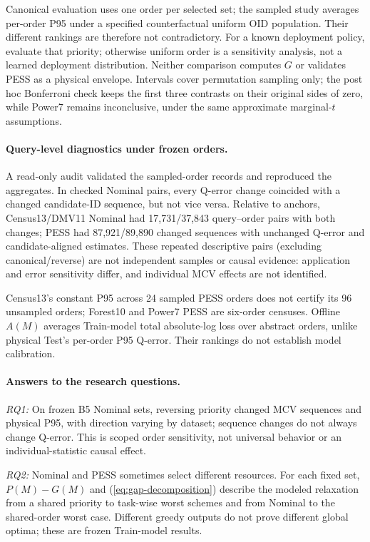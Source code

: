\documentclass[sigconf, nonacm]{acmart}
\begin{document}
Canonical evaluation uses one order per selected set; the sampled
study averages per-order P95 under a specified counterfactual uniform
OID population. Their different rankings are therefore not
contradictory. For a known deployment policy, evaluate that priority;
otherwise uniform order is a sensitivity analysis, not a learned
deployment distribution. Neither comparison computes \(G\) or
validates PESS as a physical envelope. Intervals cover permutation
sampling only; the post hoc Bonferroni check keeps the first three
contrasts on their original sides of zero, while Power7 remains
inconclusive, under the same approximate marginal-\(t\) assumptions.

\paragraph{Query-level diagnostics under frozen orders.}
A read-only audit validated the sampled-order records and reproduced
the aggregates. In checked Nominal pairs, every Q-error change
coincided with a changed candidate-ID sequence, but not vice versa.
Relative to anchors, Census13/DMV11 Nominal had 17,731/37,843
query--order pairs with both changes; PESS had 87,921/89,890
changed sequences with unchanged Q-error and candidate-aligned
estimates. These repeated descriptive pairs (excluding
canonical/reverse) are not independent samples or causal evidence:
application and error sensitivity differ, and individual MCV effects
are not identified.

Census13's constant P95 across 24 sampled PESS orders does not
certify its 96 unsampled orders; Forest10 and Power7 PESS are
six-order censuses. Offline \(A(M)\) averages Train-model total
absolute-log loss over abstract orders, unlike physical Test's
per-order P95 Q-error. Their rankings do not establish model
calibration.
\paragraph{Answers to the research questions.}
\emph{RQ1:} On frozen B5 Nominal sets, reversing priority changed
MCV sequences and physical P95, with direction varying by dataset;
sequence changes do not always change Q-error. This is scoped order
sensitivity, not universal behavior or an individual-statistic
causal effect.

\emph{RQ2:} Nominal and PESS sometimes select different resources.
For each fixed set, \(P(M)-G(M)\) and
(\ref{eq:gap-decomposition}) describe the modeled relaxation from a
shared priority to task-wise worst schemes and from Nominal to the
shared-order worst case. Different greedy outputs do not prove
different global optima; these are frozen Train-model results.
\end{document}
